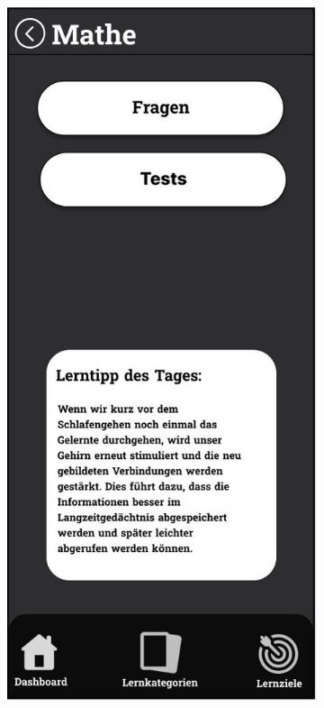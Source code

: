     \newpage

    \begin{figure}[htbp]
        \centering
        \begin{subfigure}[b]{0.45\linewidth}
          \centering
          \includegraphics[width=\linewidth]{images/Mockups/FragenTests.JPG}

\end{subfigure}
\end{figure}
